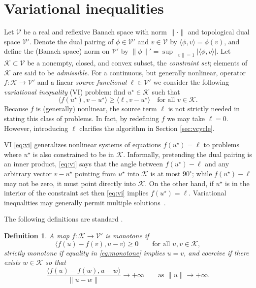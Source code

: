 \documentclass[letterpaper,final,12pt,reqno]{amsart}
\theoremstyle{cstyle}
\theoremstyle{cstyle*}
\theoremstyle{dstyle}
\newtheorem{definition}[theorem]{Definition}
\numberwithin{equation}{section}
\numberwithin{figure}{section}
\numberwithin{table}{section}
\numberwithin{theorem}{section}
\newcommand{\cK}{\mathcal{K}}
\newcommand{\cV}{\mathcal{V}}
\newcommand{\ip}[2]{\langle#1,#2\rangle}
\begin{document}
\section{Variational inequalities} \label{sec:vi}

Let $\cV$ be a real and reflexive Banach space with norm $\|\cdot\|$ and topological dual space $\cV'$.  Denote the dual pairing of $\phi \in \cV'$ and $v\in\cV$ by $\ip{\phi}{v} = \phi(v)$, and define the (Banach space) norm on $\cV'$ by $\|\phi\|' = \sup_{\|v\|=1} |\ip{\phi}{v}|$.  Let $\cK \subset \cV$ be a nonempty, closed, and convex subset, the \emph{constraint set}; elements of $\cK$ are said to be \emph{admissible}.  For a continuous, but generally nonlinear, operator $f:\cK \to \cV'$ and a linear \emph{source functional} $\ell\in \cV'$ we consider the following \emph{variational inequality} (VI) problem: find $u^\star\in \cK$ such that
\begin{equation}
\ip{f(u^\star)}{v-u^\star} \ge \ip{\ell}{v-u^\star} \quad \text{for all } v\in \cK. \label{eq:vi}
\end{equation}
Because $f$ is (generally) nonlinear, the source term $\ell$ is not strictly needed in stating this class of problems.  In fact, by redefining $f$ we may take $\ell=0$.  However, introducing $\ell$ clarifies the algorithm in Section \ref{sec:vcycle}.

VI \eqref{eq:vi} generalizes nonlinear systems of equations $f(u^\star)=\ell$ to problems where $u^\star$ is also constrained to be in $\cK$.  Informally, pretending the dual pairing is an inner product, \eqref{eq:vi} says that the angle between $f(u^\star)-\ell$ and any arbitrary vector $v-u^\star$ pointing from $u^\star$ into $\cK$ is at most $90^\circ$; while $f(u^\star)-\ell$ may not be zero, it must point directly into $\cK$.  On the other hand, if $u^\star$ is in the interior of the constraint set then \eqref{eq:vi} implies $f(u^\star)=\ell$.
Variational inequalities may generally permit multiple solutions~\cite{Farrell2019}.

The following definitions are standard \cite{KinderlehrerStampacchia1980}.

\begin{definition}  A map $f:\cK \to \cV'$ is \emph{monotone} if
\begin{equation}
\ip{f(u)-f(v)}{u-v} \ge 0 \qquad \text{for all } u,v \in \cK, \label{eq:monotone}
\end{equation}
\emph{strictly monotone} if equality in \eqref{eq:monotone} implies $u=v$, and \emph{coercive} if there exists $w \in \cK$ so that
\begin{equation}
\frac{\ip{f(u)-f(w)}{u-w}}{\|u-w\|} \to +\infty \qquad \text{as } \|u\|\to +\infty. \label{eq:coercive}
\end{equation}
\end{definition}
\end{document}
